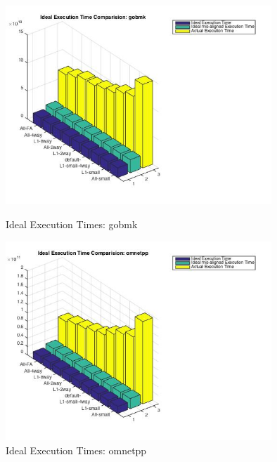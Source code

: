 \documentclass[11pt,titlepage]{article}
\begin{document}
    \begin{figure}[H]
      \centering
      \begin{minipage}{.5\textwidth}
        \centering
        \includegraphics[width=10cm]{idealGobmk}
        \caption{Ideal Execution Times: gobmk}
        \label{fig:idealG}
      \end{minipage}%
      \begin{minipage}{.5\textwidth}
        \centering
        \includegraphics[width=10cm]{idealOmnetpp}
        \caption{Ideal Execution Times: omnetpp}
        \label{fig:idealO}
      \end{minipage}
    \end{figure}
\end{document}
